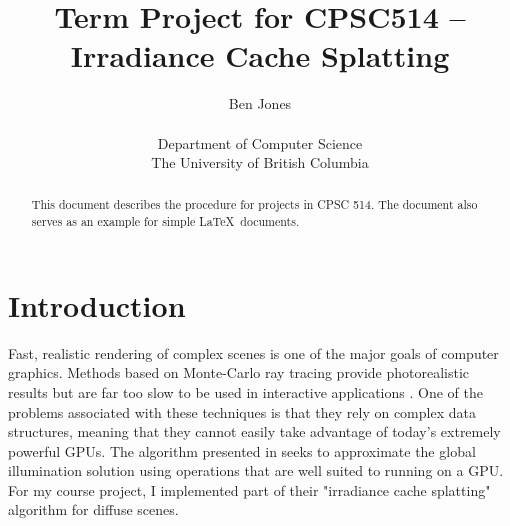 \documentclass[10pt,twopage]{acmsiggraph}
\begin{document}
%
%

\title{Term Project for CPSC514 -- Irradiance Cache Splatting}

\newcommand\name{Ben Jones}

\author{\name\\
\\
Department of Computer Science\\
The University of British Columbia}

\maketitle

%
%

\begin{abstract}
  This document describes the procedure for projects in CPSC 514. The
  document also serves as an example for simple \LaTeX\ documents.
\end{abstract}

%
%

\section{Introduction}
\label{Intro}

Fast, realistic rendering of complex scenes is one of the major goals of computer graphics.  Methods based on Monte-Carlo ray tracing provide photorealistic results but are far too slow to be used in interactive applications \cite{raytracing}.  One of the problems associated with these techniques is that they rely on complex data structures, meaning that they cannot easily take advantage of today's extremely powerful GPUs.  The algorithm presented in \cite{mainpaper} seeks to approximate the global illumination solution using operations that are well suited to running on a GPU.  For my course project, I implemented part of their "irradiance cache splatting" algorithm for diffuse scenes.
\end{document}
